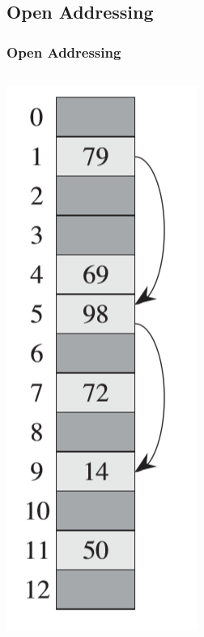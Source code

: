 \documentclass[UTF8,11pt]{beamer}
\begin{document}
\subsection{Open Addressing}
\begin{frame}
\frametitle{Open Addressing}
\begin{columns}
	\begin{column}{0.2\linewidth}
		\includegraphics[width=\linewidth]{figs/cr_open_addressing.png}

\end{column}
\end{columns}
\end{frame}
\end{document}
